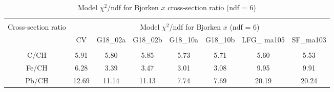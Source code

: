 \begin{table}[h]
    \centering
    \begin{adjustbox}{width=1.01\textwidth,center=\textwidth}
    \begin{tabular}{c c c c c c c c}
    \hline \\ [-1.5 ex]
    \multirow[c]{2}{*}{Cross-section ratio} & \multicolumn{7}{c}{Model $\chi^2$/ndf for Bjorken $x$ (ndf = 6) } \\ [0.8ex]
     & CV & G18\_02a & G18\_02b & G18\_10a & G18\_10b & LFG\_ ma105 & SF\_ma103\\ [0.5ex] %
    \hline
    \hline \\[-1.9ex]
    C/CH & 5.91 & 5.80 & 5.85 & 5.73 & 5.71 & 5.60 & 5.53 \\
    Fe/CH & 6.28 & 3.39 & 3.47 & 3.01 & 3.08 & 9.95 & 9.91 \\
    Pb/CH & 12.69 & 11.14 & 11.13 & 7.74 & 7.69 & 20.19 & 20.24 \\
    \hline
    \end{tabular}    
    \end{adjustbox}
    \caption{Model $\chi^2$/ndf for Bjorken $x$ cross-section ratio (ndf = 6)}
    \label{table:xsecRatio_modelComparison_x}
\end{table}



